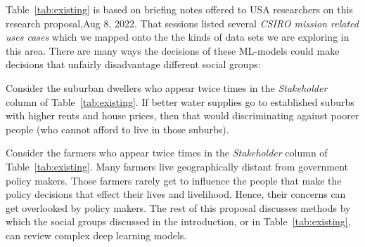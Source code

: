   Table~\ref{tab:existing}  is based on  briefing notes offered to USA researchers on this research proposal,Aug 8, 2022.
  That sessions listed several {\em CSIRO mission related
uses cases} which we
  mapped onto the
the kinds of data sets we are exploring in this area. There are many ways the decisions of these ML-models could make decisions that
unfairly disadvantage different social groups:
\bi
\item
Consider the  suburban dwellers who appear twice times in the {\em Stakeholder} column of Table~\ref{tab:existing}. 
If 
 better water supplies go to   established suburbs with higher rents and house prices, 
 then that would  discriminating against poorer people (who cannot afford to live in those suburbs).
\item
Consider the farmers who appear twice times in the {\em Stakeholder} column of Table~\ref{tab:existing}.     Many farmers 
live geographically distant from government policy makers. Those farmers rarely get to influence the people that make the policy decisions
that effect their lives and livelihood. Hence, their concerns can get overlooked by policy makers.
\ei
The rest of this proposal discusses methods by which  the social groups discussed in the introduction,  or in Table~\ref{tab:existing}, 
can review complex deep learning models.

